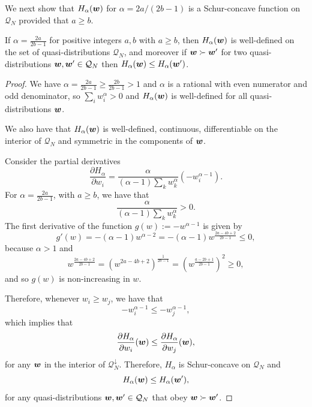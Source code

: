 \documentclass[pra,
aps,
twocolumn,
superscriptaddress,
groupedaddress,
nofootinbib,
reprint
]{revtex4-1}
\begin{document}
We next show that $H_\alpha (\boldsymbol{w})$ for $\alpha = 2a/(2b-1)$ is a Schur-concave function on $\mathcal{Q}_N$ provided that $a \ge b$.


\begingroup
\def\thetheorem{\ref{thm:HSchur}}
\begin{theorem}
	If $\alpha = \frac{2a}{2b-1}$ for positive integers $a,b$ with $a \geq b$, then $H_\alpha(\boldsymbol{w})$ is well-defined on the set of quasi-distributions $\mathcal{Q}_N$, and moreover if $\boldsymbol{w} \succ \boldsymbol{w}'$ for two quasi-distributions $\boldsymbol{w}, \boldsymbol{w}'\in \mathcal{Q}_N$ then $H_\alpha (\boldsymbol{w}) \leq H_\alpha(\boldsymbol{w}')$.
\end{theorem}
\addtocounter{theorem}{-1}
\endgroup
\begin{proof}
We have $\alpha = \frac{2a}{2b-1} \geq \frac{2b}{2b-1} > 1$ and $\alpha$ is a rational with even numerator and odd denominator, so $\sum_i w_i^\alpha > 0$ and $H_\alpha(\boldsymbol{w})$ is well-defined for all quasi-distributions $\boldsymbol{w}$.

We also have that $H_\alpha(\boldsymbol{w})$ is well-defined, continuous, differentiable on the interior of $\mathcal{Q}_N$ and symmetric in the components of $\boldsymbol{w}$.

Consider the partial derivatives
\begin{equation}
	\frac{\partial H_\alpha}{\partial w_i} = \frac{\alpha}{(\alpha-1)\sum_k{w_k^\alpha}}\left( -w_i^{\alpha-1} \right).
\end{equation}
For $\alpha= \frac{2a}{2b-1}$,  with $a\ge b$, we have that
\begin{equation}
	\frac{\alpha}{(\alpha-1)\sum_k{w_k^\alpha}} > 0.
\end{equation}
The first derivative of the function $g(w) := -w^{\alpha - 1}$ is given by
\begin{equation}
	g'(w) = -(\alpha - 1) w^{\alpha-2} = -(\alpha - 1)w^{\frac{2a-4b+2}{2b-1}} \leq 0,
\end{equation}
because $\alpha > 1$ and
\begin{equation}
	w^{\frac{2a-4b+2}{2b-1}} = \left(w^{2a-4b+2}\right)^{\frac{1}{2b-1}} = \left(w^{\frac{a-2b+1}{2b-1}}\right)^{2} \geq 0,
\end{equation}
and so $g(w)$ is non-increasing in $w$.

Therefore, whenever $w_i \geq w_j$, we have that 
\begin{equation}
	-w_i^{\alpha-1} \leq -w_j^{\alpha-1},
\end{equation}
which implies that
\begin{equation}
	\frac{\partial H_\alpha}{\partial w_i}(\boldsymbol{w}) \leq \frac{\partial H_\alpha}{\partial w_j}(\boldsymbol{w}),
\end{equation}
for any $\boldsymbol{w}$ in the interior of $\mathcal{Q}_N^\downarrow$.
Therefore, $H_\alpha$ is Schur-concave on $\mathcal{Q}_N$ and
\begin{equation}
	H_\alpha(\boldsymbol{w}) \leq H_\alpha(\boldsymbol{w}'),
\end{equation}
for any quasi-distributions $\boldsymbol{w}, \boldsymbol{w}' \in \mathcal{Q}_N$ that obey $\boldsymbol{w} \succ \boldsymbol{w}'$.
\end{proof}
\end{document}
